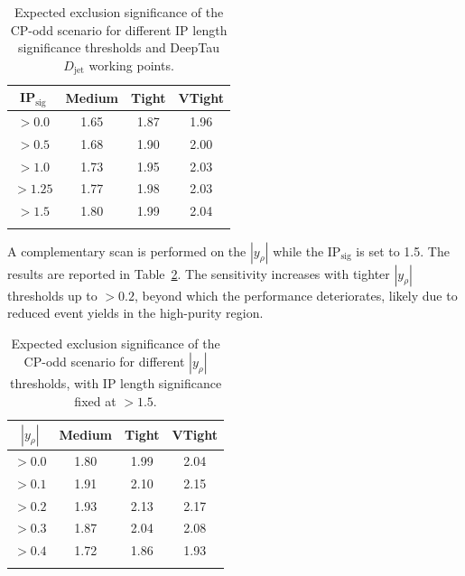 \begin{table}[!htbp]
\centering
\renewcommand{\arraystretch}{1.5} %
\setlength{\tabcolsep}{10pt} %
\begin{tabular}{c c c c}
\hline
IP$_\text{sig}$ & Medium & Tight & VTight \\
\hline
$>0.0$           & 1.65 & 1.87 & 1.96 \\
\arrayrulecolor{lightgray} \hline
$>0.5$           & 1.68 & 1.90 & 2.00 \\
\arrayrulecolor{lightgray} \hline
$>1.0$           & 1.73 & 1.95 & 2.03 \\
\arrayrulecolor{lightgray} \hline
$>1.25$          & 1.77 & 1.98 & 2.03 \\
\arrayrulecolor{lightgray} \hline
$>1.5$ & 1.80 & 1.99 & 2.04 \\
\arrayrulecolor{black} \hline
\end{tabular}
\caption{Expected exclusion significance of the CP-odd scenario for different IP length significance thresholds and DeepTau $D_{\text{jet}}$ working points.}
\label{Table:Chapter7_IPsignificance_Optimisation}
\end{table}

A complementary scan is performed on the $|y_\rho|$ while the IP$_\text{sig}$ is set to 1.5. The results are reported in Table~\ref{Table:Chapter7_yrho_Optimisation}. The sensitivity increases with tighter $|y_\rho|$ thresholds up to $>0.2$, beyond which the performance deteriorates, likely due to reduced event yields in the high-purity region.  

\begin{table}[!htbp]
\centering
\renewcommand{\arraystretch}{1.5} %
\setlength{\tabcolsep}{10pt} %
\begin{tabular}{c c c c}
\hline
$|y_\rho|$ & Medium & Tight & VTight \\
\hline
$>0.0$ & 1.80 & 1.99 & 2.04 \\
\arrayrulecolor{lightgray} \hline
$>0.1$           & 1.91 & 2.10 & 2.15 \\
\arrayrulecolor{lightgray} \hline

$>0.2$           & 1.93 & 2.13 & 2.17 \\
\arrayrulecolor{lightgray} \hline

$>0.3$           & 1.87 & 2.04 & 2.08 \\
\arrayrulecolor{lightgray} \hline

$>0.4$           & 1.72 & 1.86 & 1.93 \\
\arrayrulecolor{black} \hline
\end{tabular}
\caption{Expected exclusion significance of the CP-odd scenario for different $|y_\rho|$ thresholds, with IP length significance fixed at $>1.5$.}
\label{Table:Chapter7_yrho_Optimisation}
\end{table}

